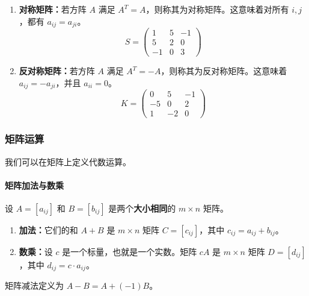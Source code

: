 \begin{enumerate}
    \item \textbf{对称矩阵：}若方阵 $A$ 满足 $A^T=A$，则称其为对称矩阵。这意味着对所有 $i,j$，都有 $a_{ij}=a_{ji}$。
    \[ S = \begin{pmatrix} 1 & 5 & -1 \\ 5 & 2 & 0 \\ -1 & 0 & 3 \end{pmatrix} \]
    \item \textbf{反对称矩阵：}若方阵 $A$ 满足 $A^T=-A$，则称其为反对称矩阵。这意味着 $a_{ij}=-a_{ji}$，并且 $a_{ii}=0$。
    \[ K = \begin{pmatrix} 0 & 5 & -1 \\ -5 & 0 & 2 \\ 1 & -2 & 0 \end{pmatrix} \]
\end{enumerate}

\subsubsection{矩阵运算}

我们可以在矩阵上定义代数运算。

\paragraph{矩阵加法与数乘}
\begin{definition}
设 $A=[a_{ij}]$ 和 $B=[b_{ij}]$ 是两个\textbf{大小相同}的 $m\times n$ 矩阵。
\begin{enumerate}
    \item \textbf{加法：}它们的和 $A+B$ 是 $m\times n$ 矩阵 $C=[c_{ij}]$，其中 $c_{ij}=a_{ij}+b_{ij}$。
    \item \textbf{数乘：}设 $c$ 是一个标量，也就是一个实数。矩阵 $cA$ 是 $m\times n$ 矩阵 $D=[d_{ij}]$，其中 $d_{ij}=c\cdot a_{ij}$。
\end{enumerate}
矩阵减法定义为 $A-B=A+(-1)B$。
\end{definition}

